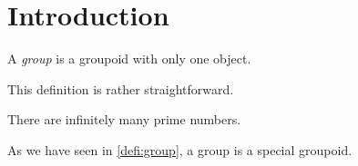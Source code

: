 \documentclass[headings=standardclasses]{scrartcl}
\begin{document}
\section{Introduction}

\begin{defi}\label{defi:group}
  A \emph{group} is a groupoid with only one object.
\end{defi}

\begin{figure}
\end{figure}

\begin{rmk}This definition is rather straightforward.\end{rmk}

\begin{thm}[Euclid]There are infinitely many prime numbers.\end{thm}
  
As we have seen in \cref{defi:group}, a group is a special groupoid.
\end{document}
